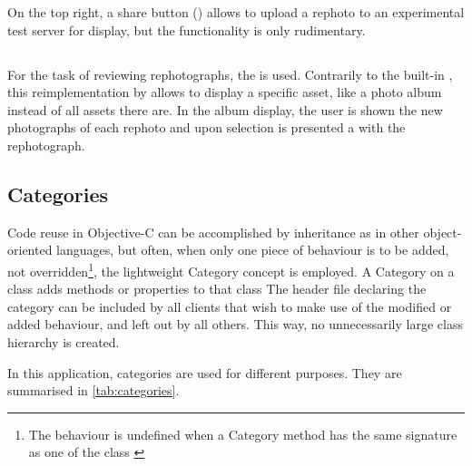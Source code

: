 On the top right, a share button ()
allows to upload a rephoto to an experimental test server for display, but the
functionality is only rudimentary.

\subsection*{}

For the task of reviewing rephotographs, the  is
used. Contrarily to the built-in , this
reimplementation by \citet{nutting2013} allows to display a specific asset, like
a photo album instead of all assets there are. In the album display, the user is
shown the new photographs of each rephoto and upon selection is presented a
 with the rephotograph.

\subsection{Categories}

Code reuse in Objective-C can be accomplished by inheritance as in other
object-oriented languages, but often, when only one piece of behaviour is to be
added, not overridden\footnote{The behaviour is undefined when a Category method
has the same signature as one of the class \citep{customizing}}, the
lightweight Category concept is employed. A Category on a class adds methods
or properties to that class The header file declaring the category can be
included by all clients that wish to make use of the modified or added
behaviour, and left out by all others. This way, no unnecessarily large class
hierarchy is created.

In this application, categories are used for different purposes. They are
summarised in \autoref{tab:categories}.

